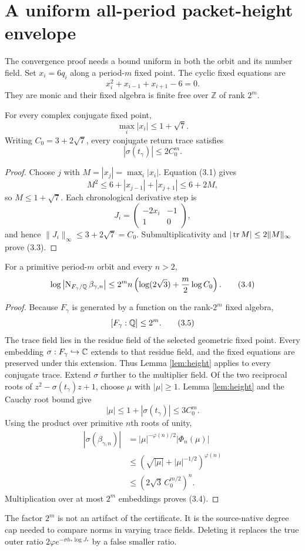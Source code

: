 \section{A uniform all-period packet-height envelope}

The convergence proof needs a bound uniform in both the orbit and its number
field.  Set $x_i=6q_i$ along a period-$m$ fixed point.  The cyclic fixed
equations are
\[
x_i^2+x_{i-1}+x_{i+1}-6=0.
\tag{3.1}
\]
They are monic and their fixed algebra is finite free over $\mathbb Z$ of
rank $2^m$.

\begin{lemma}\label{lem:height}
For every complex conjugate fixed point,
\[
\max_i|x_i|\le1+\sqrt7.
\tag{3.2}
\]
Writing $C_0=3+2\sqrt7$, every conjugate return trace satisfies
\[
|\sigma(t_\gamma)|\le2C_0^m.
\tag{3.3}
\]
\end{lemma}

\begin{proof}
Choose $j$ with $M=|x_j|=\max_i|x_i|$.  Equation (3.1) gives
\[
M^2\le6+|x_{j-1}|+|x_{j+1}|\le6+2M,
\]
so $M\le1+\sqrt7$.  Each chronological derivative step is
\[
J_i=\begin{pmatrix}-2x_i&-1\\1&0\end{pmatrix},
\]
and hence $\|J_i\|_\infty\le3+2\sqrt7=C_0$.  Submultiplicativity and
$|\operatorname{tr} M|\le2\|M\|_\infty$ prove (3.3).
\end{proof}

\begin{lemma}\label{lem:packet-envelope}
For a primitive period-$m$ orbit and every $n>2$,
\[
\log\left|\operatorname{N}_{F_\gamma/\mathbb Q}\beta_{\gamma,n}\right|
\le2^m n\left(\log(2\sqrt3)+\frac m2\log C_0\right).
\tag{3.4}
\]
\end{lemma}

\begin{proof}
Because $F_\gamma$ is generated by a function on the rank-$2^m$ fixed
algebra,
\[
[F_\gamma:\mathbb Q]\le2^m.
\tag{3.5}
\]
The trace field lies in the residue field of the selected geometric fixed
point.  Every embedding $\sigma:F_\gamma\hookrightarrow\mathbb C$ extends to that
residue field, and the fixed equations are preserved under this extension.
Thus Lemma \ref{lem:height} applies to every conjugate trace.  Extend
$\sigma$ further to the multiplier field.  Of the two reciprocal roots of
$z^2-\sigma(t_\gamma)z+1$, choose $\mu$ with $|\mu|\ge1$.  Lemma
\ref{lem:height} and the Cauchy root bound give
\[
|\mu|\le1+|\sigma(t_\gamma)|\le3C_0^m.
\tag{3.6}
\]
Using the product over primitive $n$th roots of unity,
\[
\begin{aligned}
|\sigma(\beta_{\gamma,n})|
&=|\mu|^{-\varphi(n)/2}|\Phi_n(\mu)|\\
&\le\left(\sqrt{|\mu|}+|\mu|^{-1/2}\right)^{\varphi(n)}\\
&\le\left(2\sqrt3\,C_0^{m/2}\right)^n.
\end{aligned}
\tag{3.7}
\]
Multiplication over at most $2^m$ embeddings proves (3.4).
\end{proof}

\begin{remark}
The factor $2^m$ is not an artifact of the certificate.  It is the
source-native degree cap needed to compare norms in varying trace fields.
Deleting it replaces the true outer ratio $2\varphi e^{-\sigma h_*\log
J_*}$ by a false smaller ratio.
\end{remark}
